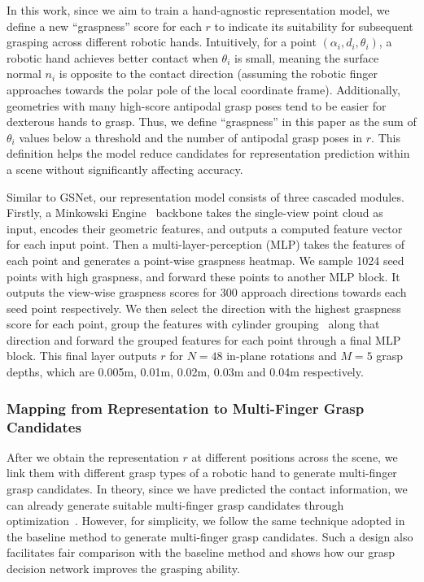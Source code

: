 In this work, since we aim to train a hand-agnostic representation model, we define a new “graspness” score for each \(r\) to indicate its suitability for subsequent grasping across different robotic hands. Intuitively, for a point \((\alpha_i, d_{i}, \theta_i)\), a robotic hand achieves better contact when \(\theta_i\) is small, meaning the surface normal \(n_i\) is opposite to the contact direction (assuming the robotic finger approaches towards the polar pole of the local coordinate frame). Additionally, geometries with many high-score antipodal grasp poses tend to be easier for dexterous hands to grasp. Thus, we define “graspness” in this paper as the sum of \(\theta_i\) values below a threshold and the number of antipodal grasp poses in \(r\). This definition helps the model reduce candidates for representation prediction within a scene without significantly affecting accuracy.

Similar to GSNet, our representation model consists of three cascaded modules. Firstly, a Minkowski Engine~\cite{choy20194d} backbone takes the single-view point cloud as input, encodes their geometric features, and outputs a computed feature vector for each input point. Then a multi-layer-perception (MLP) takes the features of each point and generates a point-wise graspness heatmap. We sample 1024 seed points with high graspness, and forward these points to another MLP block. It outputs the view-wise graspness scores for 300 approach directions towards each seed point respectively. We then select the direction with the highest graspness score for each point, group the features with cylinder grouping~\cite{fang2020graspnet} along that direction and forward the grouped features for each point through a final MLP block. This final layer outputs $r$ for $N=48$ in-plane rotations and $M=5$ grasp depths, which are 0.005m, 0.01m, 0.02m, 0.03m and 0.04m respectively.


\subsubsection*{Mapping from Representation to Multi-Finger Grasp Candidates}
After we obtain the representation $r$ at different positions across the scene, we link them with different grasp types of a robotic hand to generate multi-finger grasp candidates. In theory, since we have predicted the contact information, we can already generate suitable multi-finger grasp candidates through optimization~\cite{miller2004graspit,liu2021synthesizing}. However, for simplicity, we follow the same technique adopted in the baseline method to generate multi-finger grasp candidates. Such a design also facilitates fair comparison with the baseline method and shows how our grasp decision network improves the grasping ability.

